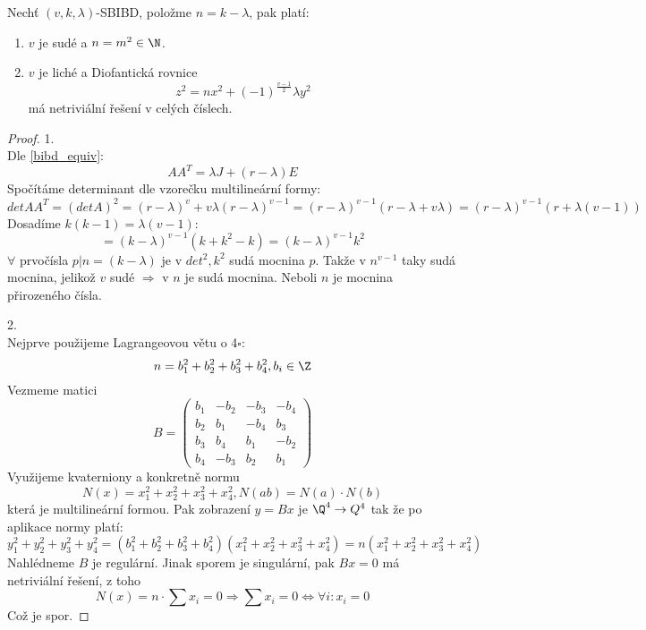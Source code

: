 \begin{theorem}\label{brc}
	Nechť $(v, k, \lambda)$-SBIBD, položme $n = k - \lambda$, pak platí:
	\begin{enumerate}
		\item $v$ je sudé a $n = m^2 \in \N$.
		\item $v$ je liché a Diofantická rovnice
			\[ z^2 = nx^2 + (-1)^{\frac{v - 1}{2}} \lambda y^2\]
			má netriviální řešení v celých číslech.
	\end{enumerate}
\end{theorem}
\begin{proof}
	1.\\
	Dle \cref{bibd_equiv}:
	\[ AA^T = \lambda J + (r - \lambda)E \]
	Spočítáme determinant dle vzorečku multilineární formy:
	\[ det AA^T = (det A)^2 = (r - \lambda)^v + v \lambda (r - \lambda)^{v - 1} = (r - \lambda)^{v - 1}(r - \lambda + v \lambda) = (r - \lambda)^{v - 1}(r + \lambda (v - 1)) \]
	Dosadíme $k(k - 1) = \lambda (v - 1)$:
	\[ = (k - \lambda)^{v - 1}(k + k^2 - k) = (k - \lambda)^{v - 1} k^2 \]
	$\forall$ prvočísla $p | n = (k - \lambda)$ je v $det^2, k^2$ sudá mocnina $p$.
	Takže v $n^{v - 1}$ taky sudá mocnina, jelikož $v$ sudé $\Rightarrow$ v $n$ je sudá mocnina.
	Neboli $n$ je mocnina přirozeného čísla.

	2.\\
	Nejprve použijeme Lagrangeovou větu o 4$\square$:
	\[ n = b_1^2 + b_2^2 + b_3^2 + b_4^2, b_i \in \Z \]
	Vezmeme matici
	\[ B =
		\begin{pmatrix}
			b_1 & -b_2 & -b_3 & -b_4\\
			b_2 & b_1 & -b_4 & b_3\\
			b_3 & b_4 & b_1 & -b_2\\
			b_4 & -b_3 & b_2 & b_1
		\end{pmatrix}
	\]
	Využijeme kvaterniony a konkretně normu
	\[ N(x) = x_1^2 + x_2^2 + x_3^2 + x_4^2, N(ab) = N(a) \cdot N(b) \]
	která je multilineární formou.
	Pak zobrazení $y = Bx$ je $\Q^4 \to Q^4$ tak že po aplikace normy platí:
	\[ y_1^2 + y_2^2 + y_3^2 + y_4^2 = (b_1^2 + b_2^2 + b_3^2 + b_4^2)(x_1^2 + x_2^2 + x_3^2 + x_4^2) = n (x_1^2 + x_2^2 + x_3^2 + x_4^2) \]
	Nahlédneme $B$ je regulární.
	Jinak sporem je singulární, pak $Bx = 0$ má netriviální řešení, z toho
	\[ N(x) = n \cdot \sum x_i = 0 \Rightarrow \sum x_i = 0 \iff \forall i: x_i = 0 \]
	Což je spor.


\end{proof}
